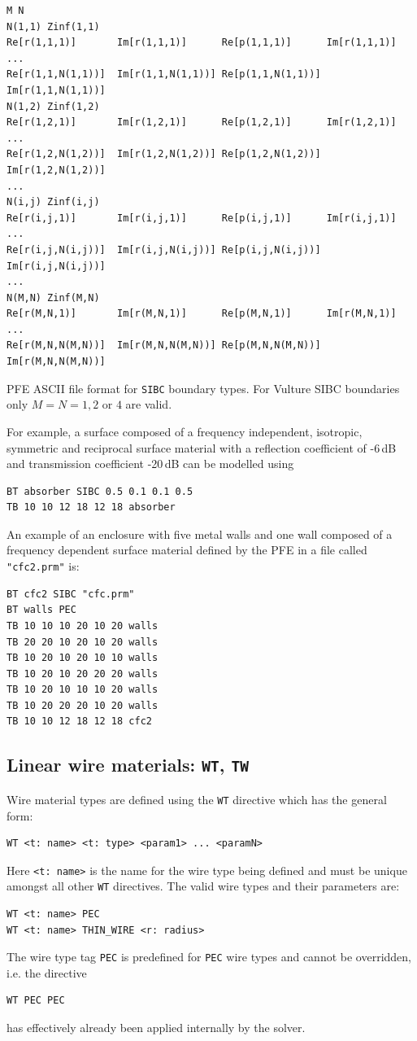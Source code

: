 \documentclass[onecolumn,a4paper]{article}
\numberwithin{equation}{section}
\begin{document}
\begin{table}[ht]
\begin{Verbatim}[frame=single]
M N
N(1,1) Zinf(1,1)
Re[r(1,1,1)]       Im[r(1,1,1)]      Re[p(1,1,1)]      Im[r(1,1,1)]
...
Re[r(1,1,N(1,1))]  Im[r(1,1,N(1,1))] Re[p(1,1,N(1,1))] Im[r(1,1,N(1,1))]
N(1,2) Zinf(1,2)
Re[r(1,2,1)]       Im[r(1,2,1)]      Re[p(1,2,1)]      Im[r(1,2,1)]
...
Re[r(1,2,N(1,2))]  Im[r(1,2,N(1,2))] Re[p(1,2,N(1,2))] Im[r(1,2,N(1,2))]
...
N(i,j) Zinf(i,j)
Re[r(i,j,1)]       Im[r(i,j,1)]      Re[p(i,j,1)]      Im[r(i,j,1)]
...
Re[r(i,j,N(i,j))]  Im[r(i,j,N(i,j))] Re[p(i,j,N(i,j))] Im[r(i,j,N(i,j))]
...
N(M,N) Zinf(M,N)
Re[r(M,N,1)]       Im[r(M,N,1)]      Re[p(M,N,1)]      Im[r(M,N,1)]
...
Re[r(M,N,N(M,N))]  Im[r(M,N,N(M,N))] Re[p(M,N,N(M,N))] Im[r(M,N,N(M,N))]
\end{Verbatim}
\caption{\label{tb:prm} PFE ASCII file format for \texttt{SIBC} boundary types. For Vulture 
SIBC boundaries only $M=N=1,2$ or $4$ are valid.}
\end{table}

For example,  a surface composed of a frequency independent, isotropic, symmetric and
reciprocal surface material with a reflection coefficient of -6\,dB and
transmission coefficient -20\,dB can be modelled using
\begin{verbatim}
BT absorber SIBC 0.5 0.1 0.1 0.5
TB 10 10 12 18 12 18 absorber
\end{verbatim}

An example of an enclosure with five metal walls and one wall composed of a 
frequency dependent surface material defined by the PFE in a file 
called \texttt{"cfc2.prm"} is:
\begin{verbatim}
BT cfc2 SIBC "cfc.prm"
BT walls PEC
TB 10 10 10 20 10 20 walls
TB 20 20 10 20 10 20 walls
TB 10 20 10 20 10 10 walls
TB 10 20 10 20 20 20 walls
TB 10 20 10 10 10 20 walls
TB 10 20 20 20 10 20 walls
TB 10 10 12 18 12 18 cfc2
\end{verbatim}

\subsection{Linear wire materials: \texttt{WT}, \texttt{TW}}

Wire material types are defined using the \texttt{WT} directive which has the general form:
\begin{verbatim}
WT <t: name> <t: type> <param1> ... <paramN>
\end{verbatim}
Here \texttt{<t:~name>} is the name for the wire type being defined and must be unique 
amongst all other \texttt{WT} directives. The valid wire types and their parameters are:
\begin{verbatim}
WT <t: name> PEC
WT <t: name> THIN_WIRE <r: radius>
\end{verbatim}
The wire type tag \texttt{PEC} is predefined for \texttt{PEC} wire types and cannot be overridden, 
i.e. the directive
\begin{verbatim}
WT PEC PEC
\end{verbatim}
has effectively already been applied internally by the solver.
\end{document}
